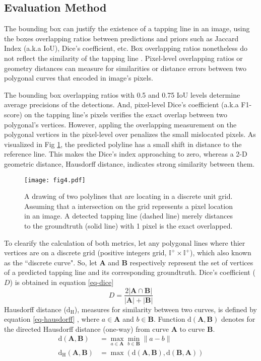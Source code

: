 \documentclass[default,pdflatex,iicol]{sn-jnl}%
\begin{document}
\subsection{Evaluation Method}
The bounding box can justify the existence of a tapping line in an image, using the boxes overlapping ratios between predictions and priors such as Jaccard Index (a.k.a IoU), Dice's coefficient, etc. Box overlapping ratios nonetheless do not reflect the similarity of the tapping line \cite{Wongtanawijit_2021}. Pixel-level overlapping ratios or geometry distances can measure for similarities or distance errors between two polygonal curves that encoded in image's pixels.

The bounding box overlapping ratios with 0.5 and 0.75 IoU levels determine average precisions of the detections. And, pixel-level Dice's coefficient (a.k.a F1-score) on the tapping line's pixels verifies the exact overlap between two polygonal's vertices. However, appling the overlapping measurement on the polygonal vertices in the pixel-level over penalizes the small mislocated pixels. As visualized in Fig \ref{fig4-polyline}, the predicted polyline has a small shift in distance to the reference line. This makes the Dice's index approaching to zero, whereas a 2-D geometric distance, Hausdorff distance, indicates strong similarity between them.

\begin{figure}[h]%
\centering
\texttt{[image: fig4.pdf]}
\caption{A drawing of two polylines that are locating in a discrete unit grid. Assuming that a intersection on the grid represents a pixel location in an image. A detected tapping line (dashed line) merely distances to the groundtruth (solid line) with 1 pixel is the exact overlapped.}\label{fig4-polyline}
\end{figure}

To clearify the calculation of both metrics, let any polygonal lines where thier vertices are on a discrete grid (positive integers grid, $\mathbb{I^+}\times \mathbb{I^+}$), which also known as the ``discrete curve". So, let $\textbf{A}$ and $\textbf{B}$ respectively represent the set of vertices of a predicted tapping line and its corresponding groundtruth. Dice's coefficient ($D$) is obtained in equation \ref{eq-dice}
\begin{equation}
D = \frac{2 \lvert \textbf{A} \cap \textbf{B} \rvert }{\lvert\textbf{A}\rvert+\lvert\textbf{B}\rvert}\label{eq-dice}
\end{equation}
Hausdorff distance ($\mathrm{d_H}$), measures for similarity between two curves, is defined by equation \ref{eq-hausdorff} \cite{Huttenlocher1993ComparingIU}, where $a \in \textbf{A}$ and $b \in \textbf{B}$. Function $\mathrm{d}(\textbf{A},\textbf{B})$ denotes for the directed Hausdorff distance (one-way) from curve \textbf{A} to curve \textbf{B}.
\begin{align}
\mathrm{d}(\textbf{A},\textbf{B}) &= \max_{a\in\textbf{A}} \min_{b\in\textbf{B}} \| a-b \|  \nonumber \\
\mathrm{d_H}(\textbf{A},\textbf{B}) &= \max (\mathrm{d}(\textbf{A},\textbf{B}), \mathrm{d}(\textbf{B},\textbf{A})) \label{eq-hausdorff}
\end{align}
\end{document}
